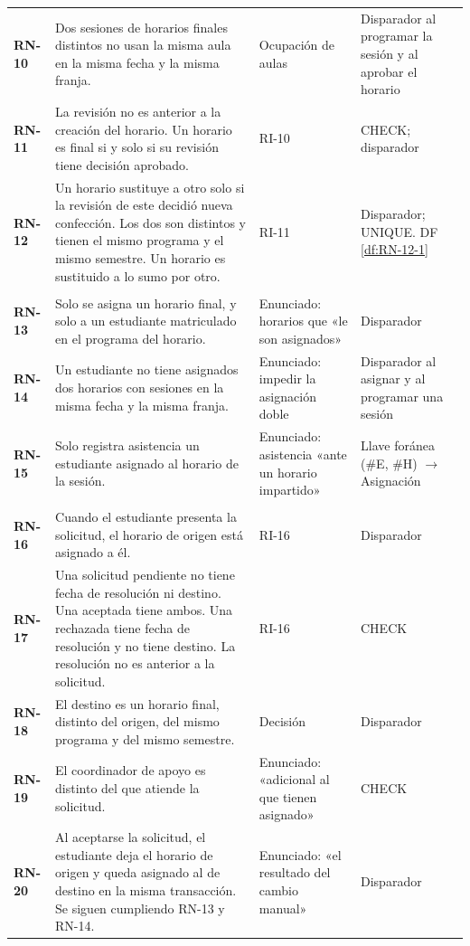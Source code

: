 {\begin{xltabular}{\linewidth}{>{\bfseries}p{11mm}L{1.35}L{0.75}L{0.6}}
RN-10 & Dos sesiones de horarios finales distintos no usan la misma aula en la misma fecha y la misma franja. & Ocupación de aulas & Disparador al programar la sesión y al aprobar el horario \\
RN-11 & La revisión no es anterior a la creación del horario. Un horario es final si y solo si su revisión tiene decisión aprobado. & RI-10 & CHECK; disparador \\
RN-12 & Un horario sustituye a otro solo si la revisión de este decidió nueva confección. Los dos son distintos y tienen el mismo programa y el mismo semestre. Un horario es sustituido a lo sumo por otro. & RI-11 & Disparador; UNIQUE. DF \ref{df:RN-12-1} \\
 \\
RN-13 & Solo se asigna un horario final, y solo a un estudiante matriculado en el programa del horario. & Enunciado: horarios que «le son asignados» & Disparador \\
RN-14 & Un estudiante no tiene asignados dos horarios con sesiones en la misma fecha y la misma franja. & Enunciado: impedir la asignación doble & Disparador al asignar y al programar una sesión \\
RN-15 & Solo registra asistencia un estudiante asignado al horario de la sesión. & Enunciado: asistencia «ante un horario impartido» & Llave foránea (\#E, \#H) $\to$ Asignación \\
 \\
RN-16 & Cuando el estudiante presenta la solicitud, el horario de origen está asignado a él. & RI-16 & Disparador \\
RN-17 & Una solicitud pendiente no tiene fecha de resolución ni destino. Una aceptada tiene ambos. Una rechazada tiene fecha de resolución y no tiene destino. La resolución no es anterior a la solicitud. & RI-16 & CHECK \\
RN-18 & El destino es un horario final, distinto del origen, del mismo programa y del mismo semestre. & Decisión & Disparador \\
RN-19 & El coordinador de apoyo es distinto del que atiende la solicitud. & Enunciado: «adicional al que tienen asignado» & CHECK \\
RN-20 & Al aceptarse la solicitud, el estudiante deja el horario de origen y queda asignado al de destino en la misma transacción. Se siguen cumpliendo RN-13 y RN-14. & Enunciado: «el resultado del cambio manual» & Disparador \\

\end{xltabular}}

